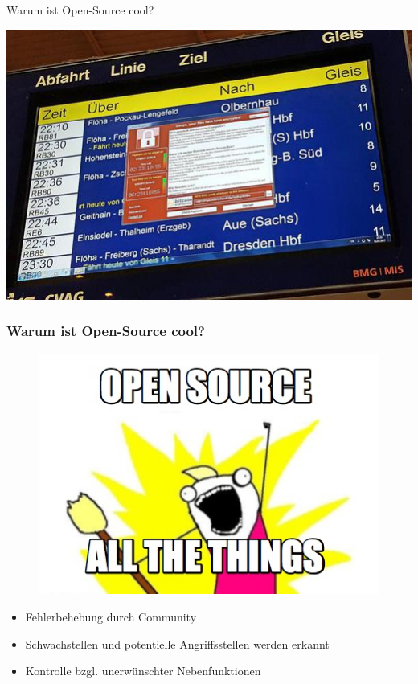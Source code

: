 \begin{frame}
	\centering\Huge Warum ist Open-Source cool?
\end{frame}

\begin{frame}
	\centering\includegraphics[scale=1.7]{resources/wannacrydb.jpg}
\end{frame}

\begin{frame}
\frametitle{Warum ist Open-Source cool?}
\begin{figure}
\includegraphics[scale=0.4]{resources/att.jpg}
\end{figure}
\begin{itemize}
	\item Fehlerbehebung durch Community
	\item Schwachstellen und potentielle Angriffsstellen werden erkannt
	\item Kontrolle bzgl. unerwünschter Nebenfunktionen
\end{itemize}
\end{frame}


